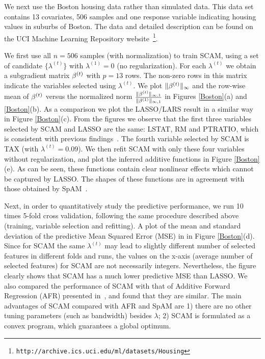 
We next use the Boston housing data rather than simulated data. This data set
contains 13 covariates, 506 samples and one response variable
indicating housing values in suburbs of Boston. The data and detailed description
can be found on the UCI Machine Learning Repository website~\footnote{\texttt{http://archive.ics.uci.edu/ml/datasets/Housing}}. 

We first use all $n=506$ samples (with normalization) to train SCAM, using
a set of candidate $\{\lambda^{(t)}\}$ with $\lambda^{(1)}=0$ (no regularization). For each $\lambda^{(t)}$
we obtain a subgradient matrix $\beta^{(t)}$ with $p=13$ rows. The non-zero
rows in this matrix indicate the variables selected using $\lambda^{(t)}$. 
We plot $\|\beta^{(t)}\|_{\infty}$ and the row-wise mean of $\beta^{(t)}$ versus the normalized
norm $\frac{\|\beta^{(t)}\|_{\infty,1}}{\|\beta^{(1)}\|_{\infty,1}}$ in Figures \ref{Boston}(a) and \ref{Boston}(b).
As a comparison we plot the LASSO/LARS result in a similar way in Figure \ref{Boston}(c).
From the figures we observe that the first three variables selected by SCAM
and LASSO are the same: LSTAT, RM and PTRATIO, which is consistent with previous findings~\cite{SpAM:07}.
The fourth variable selected by SCAM is TAX (with $\lambda^{(t)}=0.09$).
We then refit SCAM with only these four variables without regularization, and plot the inferred additive
functions in Figure \ref{Boston}(e). As can be seen, these functions contain clear nonlinear effects which cannot be captured
by LASSO. The shapes of these functions are in agreement with those obtained by SpAM~\cite{SpAM:07}.

Next, in order to quantitatively study the predictive performance, we run 10 times 5-fold cross validation, following
the same procedure described above (training, variable selection and
refitting).  A plot of the mean and standard
deviation of the predictive Mean Squared Error (MSE) in in Figure \ref{Boston}(d). Since for SCAM the same $\lambda^{(t)}$ may lead to
slightly different number of selected features in different folds and runs, the values on the x-axis (average number of selected features)
for SCAM are not necessarily integers. Nevertheless, the figure clearly shows that SCAM has a much lower predictive MSE than LASSO. 
We also compared the performance of SCAM with that of Additive Forward Regression (AFR) presented in~\cite{Xi:09}, and found that they are similar.
The main advantages of SCAM compared with AFR and SpAM are 1) there are no other tuning parameters (such as bandwidth)
besides $\lambda$; 2) SCAM is formulated as a convex program, which guarantees a global optimum.

